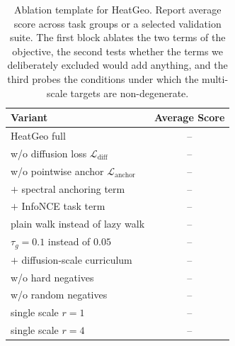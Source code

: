 \begin{table}[t]
\centering
\caption{Ablation template for HeatGeo. Report average score across task groups or a selected validation suite. The first block ablates the two terms of the objective, the second tests whether the terms we deliberately excluded would add anything, and the third probes the conditions under which the multi-scale targets are non-degenerate.}
\label{tab:ablations}
\begin{tabular}{lc}
\hline
Variant & Average Score \\
\hline
HeatGeo full & -- \\
\hline
w/o diffusion loss $\mathcal{L}_{\mathrm{diff}}$ & -- \\
w/o pointwise anchor $\mathcal{L}_{\mathrm{anchor}}$ & -- \\
\hline
$+$ spectral anchoring term & -- \\
$+$ InfoNCE task term & -- \\
\hline
plain walk instead of lazy walk & -- \\
$\tau_g=0.1$ instead of $0.05$ & -- \\
$+$ diffusion-scale curriculum & -- \\
w/o hard negatives & -- \\
w/o random negatives & -- \\
single scale $r=1$ & -- \\
single scale $r=4$ & -- \\
\hline
\end{tabular}
\end{table}

